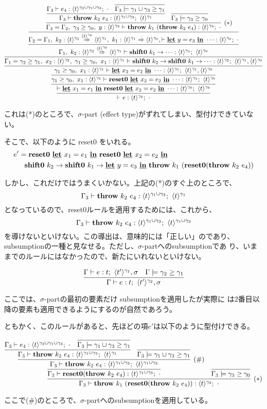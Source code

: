 \documentclass[dvipdfmx]{jsarticle}
\newcommand\longer[2]{{#1} \ord {#2}}
\newcommand\uni{\cup} %
\begin{document}
\[
  \proofone
\]

これは(*)のところで、$\sigma$-part (effect type)がずれてしまい、型付けできていない。

そこで、以下のように reset0 をいれる。
\begin{align*}
  e' &= \textbf{reset0}~\underline{\textbf{let}}~x_1=e_1~\underline{\textbf{in}}~\textbf{reset0}~\underline{\textbf{let}}~x_2=e_2~\underline{\textbf{in}} \\
     &\phantom{=}  \textbf{shift0}~{k_2}\to{\textbf{shift0}~{k_1}\to{\underline{\textbf{let}}~y=e_3~\underline{\textbf{in}}~
       \textbf{throw}~{k_1}~{(\textbf{reset0}(\textbf{throw}~{k_2}~{e_4}))}}}
\end{align*}

しかし、これだけではうまくいかない。上記の(*)のすぐ上のところで、
\[
  \Gamma_3 \vdash \throw{k_2}{e_4} : \tonethree;~\tone
\]
となっているので、reset0ルールを適用するためには、これから、
\[
  \Gamma_3 \vdash \throw{k_2}{e_4} : \tonethree;~\tonethree
\]
を導けないといけない。この導出は、意味的には「正しい」のであり、
subsumptionの一種と見なせる。ただし、$\sigma$-partへのsubsumptionであ
り、いままでのルールにはなかったので、新たにいれないといけない。

\[
  \infer
  {\Gamma \vdash e : t;~\codeT{t'}{\gamma_2},\sigma}
  {\Gamma \vdash e : t;~\codeT{t'}{\gamma_1},\sigma
    & \Gamma \models \gamma_2 \ord \gamma_1
  }
\]

ここでは、$\sigma$-partの最初の要素だけ subsumptionを適用したが実際に
は2番目以降の要素も適用できるようにするのが自然であろう。

ともかく、このルールがあると、先ほどの項$e'$は以下のように型付けできる。

\def\prooffive{
  \infer[(*)]
  {\Gamma_3\vdash \throw{k_1}{(\Resetz(\throw{k_2}{e_4}))} : \tthree;~\cdot{}}
  {\infer
    {\Gamma_3 \vdash \Resetz(\throw{k_2}{e_4}) : \tonethree; ~\cdot{}}
    {\infer[(\#)]
      {\Gamma_3 \vdash \throw{k_2}{e_4} : \tonethree;~\tonethree}
      {\infer
        {\Gamma_3 \vdash \throw{k_2}{e_4} : \tonethree;~\tone}
        {\Gamma_3 \vdash e_4 :
          \codeT{t}{\gamma_2\uni\gamma_1\uni\gamma_3};~\cdot
          & \infer{\Gamma_3 \models
            \longer{\gamma_1\uni\gamma_3}{\gamma_1}}{}
        }
        & \infer{\Gamma_3 \models \longer{\gamma_1\uni\gamma_3}{\gamma_1}}{}
      }
    }
    & \infer{\Gamma_3 \models \longer{\gamma_3}{\gamma_0}}{}
  }
}

\[
  \prooffive
\]

ここで(\#)のところで、$\sigma$-partへのsubsumptionを適用している。
\end{document}
